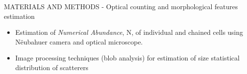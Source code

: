 \documentclass[handout]{beamer}
\newcommand\Fontable{\fontsize{9}{10}\selectfont}
\begin{document}
\begin{frame}{MATERIALS AND METHODS - Optical counting and morphological features estimation}
\Fontable

\begin{itemize}
\item Estimation of \textit{Numerical Abundance}, N, of individual and chained cells using Nëubahuer camera and optical microscope.
\end{itemize}

\vspace{0.3pc}
\begin{minipage}[c]{1\linewidth}
\begin{minipage}[c]{0.7\linewidth}
\begin{itemize}
	\Fontable
	\item<3-> Image processing techniques (blob analysis) for estimation of size statistical distribution of scatterers
	
\end{itemize}
\end{minipage}
\begin{minipage}[c]{0.29\linewidth}
\end{minipage}
\end{minipage}


\end{frame}
\end{document}
